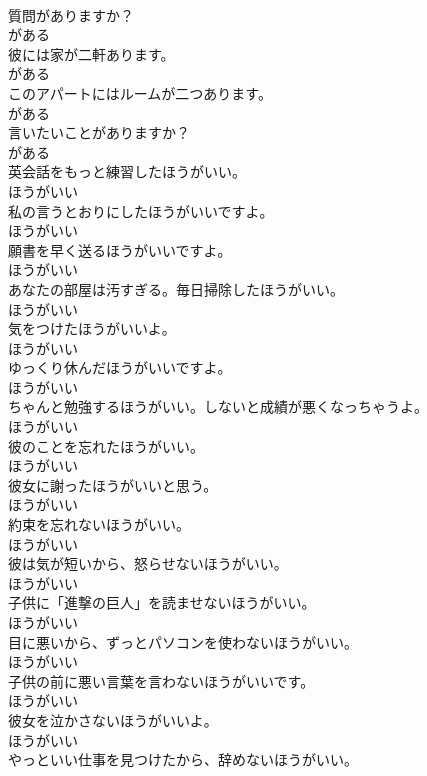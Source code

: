 \documentclass[8pt]{extreport}
\begin{document}
\begin{CJK}{UTF8}{min}
\\	質問がありますか？	
\\	がある
\\	彼には家が二軒あります。	
\\	がある
\\	このアパートにはルームが二つあります。	
\\	がある
\\	言いたいことがありますか？	
\\	がある
\\	英会話をもっと練習したほうがいい。	
\\	ほうがいい
\\	私の言うとおりにしたほうがいいですよ。	
\\	ほうがいい
\\	願書を早く送るほうがいいですよ。	
\\	ほうがいい
\\	あなたの部屋は汚すぎる。毎日掃除したほうがいい。	
\\	ほうがいい
\\	気をつけたほうがいいよ。	
\\	ほうがいい
\\	ゆっくり休んだほうがいいですよ。	
\\	ほうがいい
\\	ちゃんと勉強するほうがいい。しないと成績が悪くなっちゃうよ。	
\\	ほうがいい
\\	彼のことを忘れたほうがいい。	
\\	ほうがいい
\\	彼女に謝ったほうがいいと思う。	
\\	ほうがいい
\\	約束を忘れないほうがいい。	
\\	ほうがいい
\\	彼は気が短いから、怒らせないほうがいい。	
\\	ほうがいい
\\	子供に「進撃の巨人」を読ませないほうがいい。	
\\	ほうがいい
\\	目に悪いから、ずっとパソコンを使わないほうがいい。	
\\	ほうがいい
\\	子供の前に悪い言葉を言わないほうがいいです。	
\\	ほうがいい
\\	彼女を泣かさないほうがいいよ。	
\\	ほうがいい
\\	やっといい仕事を見つけたから、辞めないほうがいい。	

\end{CJK}
\end{document}

